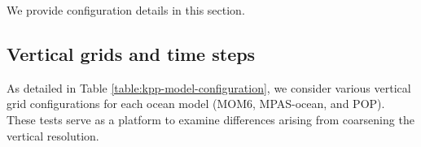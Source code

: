 We provide configuration details in this section.  


\subsection{Vertical grids and time steps}

As detailed in Table \ref{table:kpp-model-configuration}, we consider
various vertical grid configurations for each ocean model (MOM6,
MPAS-ocean, and POP). These tests serve as a platform to examine
differences arising from coarsening the vertical resolution.

\begin{table}[h!t]
\caption{Model vertical grid spacing, bottom depth,  and time steps
  for the CVMix column tests.  Note that each test 
  with MOM6 was run on a workstation, which constrains the size of the
  finest grid spacing.   The MOM6-CM4 vertical spacing corresponds to
  the spacing used in the CM4 global climate model being developed 
  at GFDL.}
\label{table:kpp-model-configuration}
\end{table}


